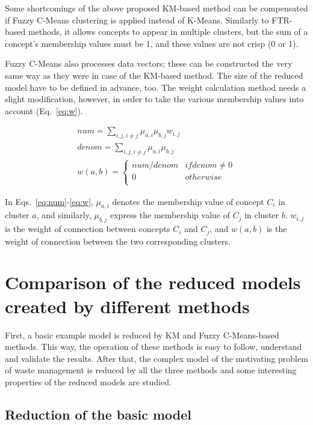 \documentclass[graybox]{svmult}
\begin{document}
Some shortcomings of the above proposed KM-based method can be 
compensated if Fuzzy C-Means clustering \cite{yen1999fuzzy} is applied instead of K-Means.
Similarly to FTR-based methods, it allows concepts to appear in 
multiple clusters, but the sum of a concept's membership values must be 
1, and these values are not crisp (0 or 1).

Fuzzy C-Means also processes data vectors; these can be constructed 
the very same way as they were in case of the KM-based method. The size 
of the reduced model have to be defined in advance, too. The weight 
calculation method needs a slight modification, however, in order to 
take the various membership values into account (Eq.~\ref{eq:w}).

\begin{eqnarray}
  \label{eq:num} num = \sum_{i,j,i \ne j}\mu_{a,i}\mu_{b,j}w_{i,j} \\
  \label{eq:denom} denom = \sum_{i,j,i \ne j}\mu_{a,i}\mu_{b,j} \\
  \label{eq:w} w(a,b) = \left \{ 
    \begin{array}{ll}
      num/denom & if denom \ne 0 \\
      0         & otherwise \\
    \end{array}
  \right.
\end{eqnarray}

In Eqs.~\ref{eq:num}-\ref{eq:w}, $\mu_{a,i}$ denotes the membership 
value of concept $C_i$ in cluster $a$, and similarly, $\mu_{b,j}$ 
express the membership value of $C_j$ in cluster $b$. $w_{i,j}$ is the 
weight of connection between concepts $C_i$ and $C_j$, and $w(a,b)$ is 
the weight of connection between the two corresponding clusters.

\section{Comparison of the reduced models created by different methods}

First, a basic example model is reduced by KM and Fuzzy C-Means-based 
methods. This way, the operation of these methods is easy to follow, 
understand and validate the results. After that, the complex model of 
the motivating problem of waste management is reduced by all the three 
methods and some interesting properties of the reduced models are 
studied.

\subsection{Reduction of the basic model}
\end{document}
